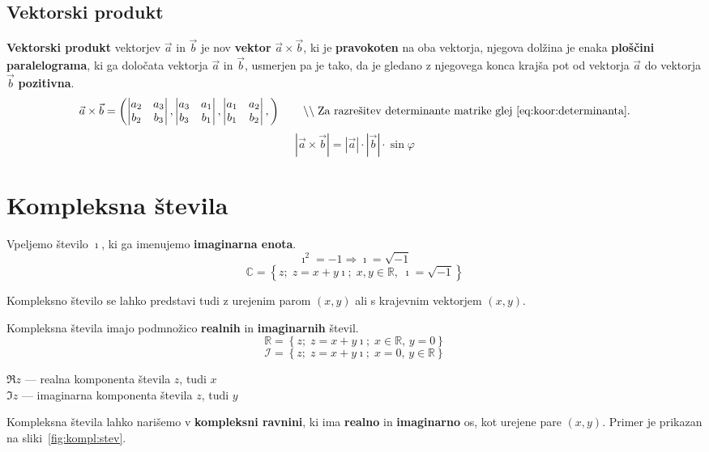 \documentclass[a4paper,oneside,12pt,fleqn]{article}
\def\R{\ensuremath{\mathbb R}}
\def\C{\ensuremath{\mathbb C}}
\def\I{\ensuremath{\mathcal I}}
\newcommand\krat\cdot
\newcommand{\comment}[1]{\ensuremath{\qquad\backslash\backslash\;}\textnormal{#1}}
\newcommand{\ii}{\ensuremath{\imath}}
\renewcommand\implies\Rightarrow
\numberwithin{equation}{section}
\begin{document}
\subsection{Vektorski produkt}
\label{sec:vec:vec}
\textbf{Vektorski produkt} vektorjev $\vec{a}$ in $\vec{b}$ je nov \textbf{vektor} $\vec{a} \times \vec{b}$,
ki je  \textbf{pravokoten} na oba vektorja, njegova dolžina je enaka \textbf{ploščini paralelograma}, ki ga
določata vektorja $\vec{a}$ in $\vec{b}$, usmerjen pa je tako, da je gledano z njegovega
konca krajša pot od vektorja $\vec{a}$ do vektorja $\vec{b}$ \textbf{pozitivna}.
\[ \vec{a}\times\vec{b} = \left(
\begin{vmatrix} a_2 & a_3 \\ b_2 & b_3 \end{vmatrix},
\begin{vmatrix} a_3 & a_1 \\ b_3 & b_1 \end{vmatrix},
\begin{vmatrix} a_1 & a_2 \\ b_1 & b_2 \end{vmatrix},
\right) \comment{Za razrešitev determinante matrike glej~\eqref{eq:koor:determinanta}.} \]
\[ \left| \vec{a}\times\vec{b} \right| = |\vec{a}| \krat |\vec{b}| \krat\sin\varphi \]

\section{Kompleksna števila}
\label{sec:kompl}
Vpeljemo število $\ii$, ki ga imenujemo \textbf{imaginarna enota}.
\[\ii^2 = -1 \implies \ii = \sqrt{-1} \]
\[ \C = \left\{z; \; z=x+y\ii; \; x,y \in \R, \; \ii = \sqrt{-1} \right\} \]

Kompleksno število se lahko predstavi tudi z urejenim parom $(x,y)$ ali s krajevnim
vektorjem $(x,y)$.

Kompleksna števila imajo podmnožico \textbf{realnih} in \textbf{imaginarnih} števil.
\[ \R = \left\{ z; \; z = x+y\ii; \; x \in \R, \, y = 0 \right\} \]
\[ \I = \left\{ z; \; z = x+y\ii; \; x = 0, \, y \in \R \right\} \]

$\Re z$ --- realna komponenta števila $z$, tudi $x$\\
$\Im z$ --- imaginarna komponenta števila $z$, tudi $y$

Kompleksna števila lahko narišemo v \textbf{kompleksni ravnini}, ki ima \textbf{realno} in
\textbf{imaginarno} os, kot urejene pare $(x,y)$. Primer je prikazan na sliki~\ref{fig:kompl:stev}.
\end{document}
